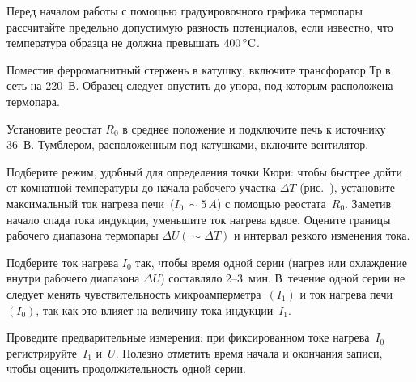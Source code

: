 \begin{lab:task}


\item
  \label{item:1}
  Перед началом работы с помощью градуировочного графика термопары рассчитайте
предельно допустимую разность потенциалов, если известно, что температура
образца не должна превышать $400\,^\circ\mathrm{C}$.

\item \label{p:43:2}
  Поместив ферромагнитный стержень в катушку, включите трансфоратор $\text{Тр}$
в сеть на 220~В. Образец следует опустить до упора, под которым расположена
термопара.


\item
  Установите реостат $R_0$ в среднее положение и подключите печь к ис­точнику
36~В. Тумблером, расположенным под катушками, включите вентилятор.

\item
  Подберите режим, удобный для определения точки Кюри: чтобы быстрее дойти от
комнатной температуры до начала рабочего участка $\Delta T$
(рис.~), установите максимальный
ток нагрева печи~($I_0\,\sim5\,A$) с помощью реостата~$R_0$. Заметив начало
спада тока индукции, уменьшите ток нагрева вдвое. Оцените границы рабочего
диапазона термопары $\Delta U (\sim\Delta T)$ и интервал резкого изменения
тока. 


\item 
Подберите ток нагрева $I_0$ так, чтобы время одной серии (нагрев или охлаждение
внутри рабочего диапазона $\Delta U$) составляло 2--3~мин. В~течение одной
серии не следует менять чувствительность микроамперметра~$(I_1)$ и ток нагрева
печи~$(I_0)$, так как это влияет на величину тока индукции~$I_1$.

\item 
Проведите предварительные измерения: при фиксированном токе нагрева~$I_0$
регистрируйте~$I_1$ и~$U$. Полезно отметить время начала и окончания
записи, чтобы оценить продолжительность одной серии.


\end{lab:task}
